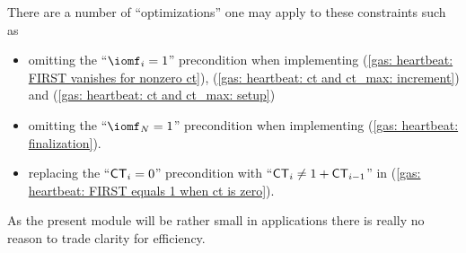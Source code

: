 \saNote{} There are a number of ``optimizations'' one may apply to these constraints such as
\begin{itemize}
	\item  
		omitting the ``\If $\iomf_{i} = 1$'' precondition when implementing
		(\ref{gas: heartbeat: FIRST vanishes for nonzero ct}),
		(\ref{gas: heartbeat: ct and ct_max: increment}) and
		(\ref{gas: heartbeat: ct and ct_max: setup})
	\item  
		omitting the  ``\If $\iomf_{N} = 1$'' precondition when implementing
		(\ref{gas: heartbeat: finalization}).
	\item  
		replacing the ``\If $\textsf{CT}_{i} = 0$'' precondition with 
		``\If $\textsf{CT}_{i} \neq 1 + \textsf{CT}_{i - 1}$'' in (\ref{gas: heartbeat: FIRST equals 1 when ct is zero}).
\end{itemize}
As the present module will be rather small in applications there is really no reason to trade clarity for efficiency.
